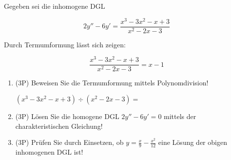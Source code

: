 Gegeben sei die inhomogene DGL

$$2y''-6y' = \frac{x^3-3x^2-x+3}{x^2-2x-3}$$

Durch Termumformung lässt sich zeigen:

$$\frac{x^3-3x^2-x+3}{x^2-2x-3} = x-1$$


\begin{enumerate}[label=(\alph*)]

\item (3P) Beweisen Sie die Termumformung mittels Polynomdivision!

$(x^3-3x^2-x+3)\div(x^2-2x-3) =$


\bigskip
\bigskip
\bigskip
\bigskip
\bigskip
\bigskip
\bigskip
\bigskip
\bigskip

\item (3P) Lösen Sie die homogene DGL $2y''-6y'=0$ mittels der charakteristischen Gleichung!

\bigskip
\bigskip
\bigskip
\bigskip
\bigskip
\bigskip
\bigskip
\bigskip
\bigskip

\item (3P) Prüfen Sie durch Einsetzen, ob $y=\frac{x}{9}-\frac{x^2}{12}$ eine Lösung der obigen inhomogenen DGL ist!

\end{enumerate}
